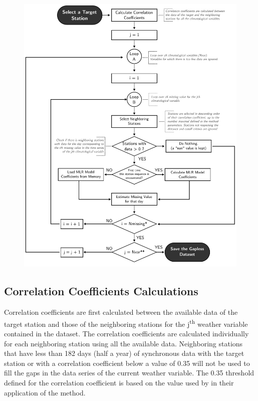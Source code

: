 \documentclass[TechnicalNoteMeteo.tex]{subfiles}
\begin{document}
\begin{figure}[!p]
    \centering
    \includegraphics[width=\textwidth]{img/Flowchart-filling_missing_weather.pdf} 
    \caption{}
    \label{fig:fillworker_flowchart}
\end{figure}

\subsection{Correlation Coefficients Calculations}

Correlation coefficients are first calculated between the available data of the target station and those of the neighboring stations for the j\textsuperscript{th} weather variable contained in the dataset. The correlation coefficients are calculated individually for each neighboring station using all the available data. Neighboring stations that have less than 182 days (half a year) of synchronous data with the target station or with a correlation coefficient below a value of 0.35 will not be used to fill the gaps in the data series of the current weather variable. The 0.35 threshold defined for the correlation coefficient is based on the value used by \cite{eischeid_creating_2000} in their application of the method. 
\end{document}
